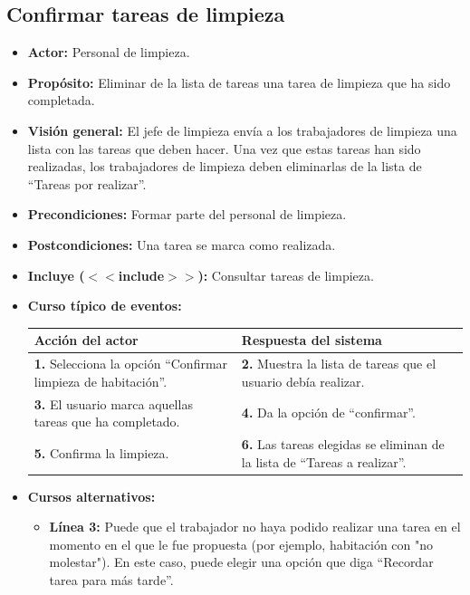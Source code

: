\documentclass[spanish,a4paper,11pt, twoside]{report}	%
\begin{document}
	
		\subsection{Confirmar tareas de limpieza}
			\begin{itemize}
			\item \textbf{Actor:} Personal de limpieza.
			\item \textbf{Propósito: }Eliminar de la lista de tareas una tarea de limpieza que ha sido completada.
			\item \textbf{Visión general: }El jefe de limpieza envía a los trabajadores de
				limpieza una lista con las tareas que deben hacer. Una vez que estas tareas han 
				sido realizadas, los trabajadores de limpieza deben eliminarlas de la lista de
				``Tareas por realizar''.
			\item \textbf{Precondiciones:} Formar parte del personal de limpieza.
			\item \textbf{Postcondiciones:} Una tarea se marca como realizada.
			\item \textbf{Incluye ($<<$include$>>$):} Consultar tareas de limpieza.%
			\item \textbf{Curso típico de eventos:}\\ 
				\begin{tabular}{|p{6cm}||p{6cm}|}
					\hline
					\textbf{Acción del actor} & \textbf{Respuesta del sistema} \\ \hline \hline
					\textbf{1.} Selecciona la opción  ``Confirmar limpieza de habitación''. & 
					\textbf{2.} Muestra la lista de tareas que el usuario debía realizar.\\ \hline 
					\textbf{3.} El usuario marca aquellas tareas que ha completado. & 
					\textbf{4.} Da la opción de ``confirmar''.\\ \hline
					\textbf{5.} Confirma la limpieza. & 
					\textbf{6.} Las tareas elegidas se eliminan de la lista de ``Tareas a realizar''. \\ \hline
									\end{tabular}
			\item \textbf{Cursos alternativos:} 
				\begin{itemize}
					\item \textbf{Línea 3:} Puede que el trabajador no haya podido realizar una
					tarea en el momento en el que le fue propuesta (por ejemplo, habitación con "no
					molestar").
					En este caso, puede elegir una opción que diga ``Recordar tarea para más tarde''.
				\end{itemize}
		\end {itemize}
\end{document}
